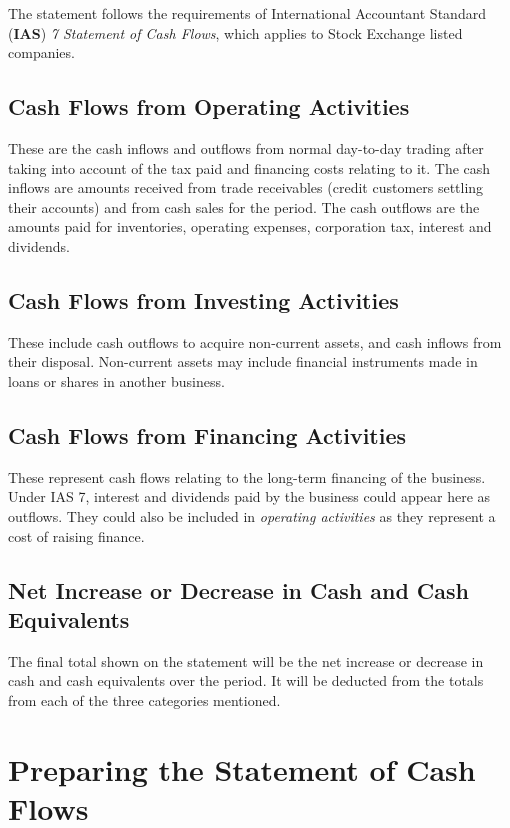 \documentclass{report}
\begin{document}
The statement follows the requirements of International Accountant Standard (\textbf{IAS}) \textit{7 Statement of Cash Flows}, which applies to Stock Exchange listed companies.\\

\subsection{Cash Flows from Operating Activities}
These are the cash inflows and outflows from normal day-to-day trading after taking into account of the tax paid and financing costs relating to it. The cash inflows are amounts received from trade receivables (credit customers settling their accounts) and from cash sales for the period. The cash outflows are the amounts paid for inventories, operating expenses, corporation tax, interest and dividends.

\subsection{Cash Flows from Investing Activities}
These include cash outflows to acquire non-current assets, and cash inflows from their disposal. Non-current assets may include financial instruments made in loans or shares in another business. 

\subsection{Cash Flows from Financing Activities}
These represent cash flows relating to the long-term financing of the business. Under IAS 7, interest and dividends paid by the business could appear here as outflows. They could also be included in \textit{operating activities} as they represent a cost of raising finance.

\subsection{Net Increase or Decrease in Cash and Cash Equivalents}
The final total shown on the statement will be the net increase or decrease in cash and cash equivalents over the period. It will be deducted from the totals from each of the three categories mentioned.

\section{Preparing the Statement of Cash Flows}
\end{document}

